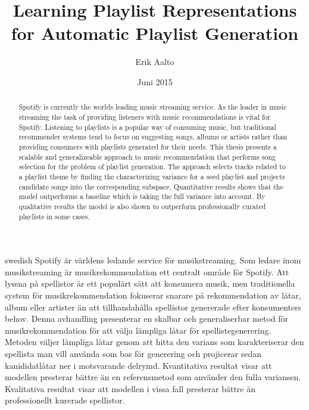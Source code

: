 \documentclass[a4paper,11pt]{kth-mag}
\title{Learning Playlist Representations for Automatic Playlist Generation}
\author{Erik Aalto}
\date{Juni 2015}
\begin{document}
\frontmatter
\pagestyle{empty}
\removepagenumbers
\maketitle
{}
\begin{abstract}
  Spotify is currently the worlds leading music streaming service. As the leader in music streaming the task of providing listeners with music recommendations is vital for Spotify. Listening to playlists is a popular way of consuming music, but traditional recommender systems tend to focus on suggesting songs, albums or artists rather than providing consumers with playlists generated for their needs. This thesis presents a scalable and generalizeable approach to music recommendation that performs song selection for the problem of playlist generation. The approach selects tracks related to a playlist theme by finding the characterizing variance for a seed playlist and projects candidate songs into the corresponding subspace. Quantitative results shows that the model outperforms a baseline which is taking the full variance into account. By qualitative results the model is also shown to outperform professionally curated playlists in some cases.


\end{abstract}
\clearpage
\begin{foreignabstract}{swedish}
  Spotify \"{a}r v\"{a}rldens ledande service f\"{o}r musikstreaming. Som ledare inom musikstreaming \"{a}r musikrekommendation ett centralt omr{\aa}de f\"{o}r Spotify. Att lyssna p{\aa} spellistor \"{a}r ett popul\"{a}rt s\"{a}tt att konsumera musik, men traditionella system f\"{o}r musikrekommendation fokuserar snarare p{\aa} rekommendation av l{\aa}tar, album eller artister \"{a}n att tillhandah{\aa}lla spellistor genererade efter konsumenters behov. Denna avhandling presenterar en skalbar och generaliserbar metod f\"{o}r musikrekommendation f\"{o}r att v\"{a}lja l\"{a}mpliga l{\aa}tar f\"{o}r spellistegenerering. Metoden v\"{a}ljer l\"{a}mpliga l{\aa}tar genom att hitta den varians som karakteriserar den spellista man vill anv\"{a}nda som bas f\"{o}r generering och projicerar sedan kanididatl{\aa}tar ner i motsvarande delrymd. Kvantitativa resultat visar att modellen presterar b\"{a}ttre \"{a}n en referensmetod som anv\"{a}nder den fulla variansen. Kvalitativa resultat visar att modellen i vissa fall presterar b\"{a}ttre \"{a}n professionellt kurerade spellistor.

\end{foreignabstract}
\end{document}
